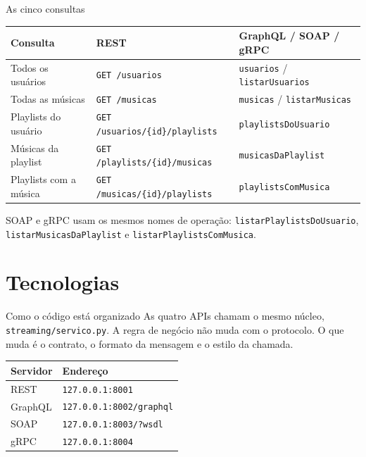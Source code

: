 \documentclass[aspectratio=169,11pt]{beamer}
\begin{document}
\begin{frame}{As cinco consultas}
  \small
  \begin{tabular}{@{}lll@{}}
    \toprule
    Consulta & REST & GraphQL / SOAP / gRPC \\
    \midrule
    Todos os usuários & \texttt{GET /usuarios} & \texttt{usuarios} / \texttt{listarUsuarios} \\
    Todas as músicas & \texttt{GET /musicas} & \texttt{musicas} / \texttt{listarMusicas} \\
    Playlists do usuário & \texttt{GET /usuarios/\{id\}/playlists} & \texttt{playlistsDoUsuario} \\
    Músicas da playlist & \texttt{GET /playlists/\{id\}/musicas} & \texttt{musicasDaPlaylist} \\
    Playlists com a música & \texttt{GET /musicas/\{id\}/playlists} & \texttt{playlistsComMusica} \\
    \bottomrule
  \end{tabular}

  \vspace{0.7em}
  SOAP e gRPC usam os mesmos nomes de operação: \texttt{listarPlaylistsDoUsuario}, \texttt{listarMusicasDaPlaylist} e \texttt{listarPlaylistsComMusica}.
\end{frame}

\section{Tecnologias}

\begin{frame}{Como o código está organizado}
  As quatro APIs chamam o mesmo núcleo, \texttt{streaming/servico.py}.
  A regra de negócio não muda com o protocolo. O que muda é o contrato, o formato da mensagem e o estilo da chamada.
  \vspace{0.5em}
  \begin{tabular}{@{}ll@{}}
    \toprule
    Servidor & Endereço \\
    \midrule
    REST & \texttt{127.0.0.1:8001} \\
    GraphQL & \texttt{127.0.0.1:8002/graphql} \\
    SOAP & \texttt{127.0.0.1:8003/?wsdl} \\
    gRPC & \texttt{127.0.0.1:8004} \\
    \bottomrule
  \end{tabular}
\end{frame}
\end{document}
